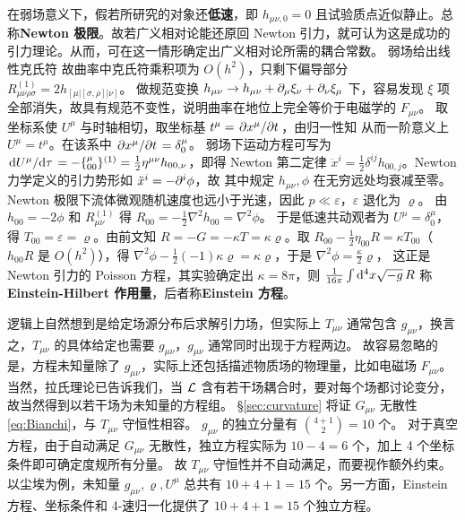 在弱场意义下，假若所研究的对象还\textbf{低速}，即 $h_{\mu\nu,0}=0$ 且试验质点近似静止。总称\textbf{Newton 极限}。故若广义相对论能还原回 Newton 引力，就可认为这是成功的引力理论。从而，可在这一情形确定出广义相对论所需的耦合常数。
弱场给出线性克氏符
故曲率中克氏符乘积项为 $O(h^2)$，只剩下偏导部分 $R^{(1)}_{\mu\nu\rho\sigma} = 2h_{[\mu|[\sigma,\rho]|\nu]}$。
做规范变换 $h_{\mu\nu} \to h_{\mu\nu} + \partial_\mu \xi_\nu + \partial_\nu \xi_\mu$ 下，容易发现 $\xi$ 项全部消失，故具有规范不变性，说明曲率在地位上完全等价于电磁学的 $F_{\mu\nu}$。
取坐标系使 $U^\mu$ 与时轴相切，取坐标基 $t^\mu=\pdv*{x^\mu}{t}$，由归一性知
从而一阶意义上 $U^\mu=t^\mu$。在该系中 $\pdv*{x^\mu}{t} = \delta^\mu_0$。
弱场下运动方程可写为 $\dv*{U^\mu}{\tau}=-\{_{00}^\mu\}^{(1)}= \frac 12 \eta^{\mu\nu} h_{00,\nu}$，即得 Newton 第二定律 $\ddot{x}^i=\frac 12 \delta^{ij} h_{00,j}$。Newton 力学定义的引力势形如 $\ddot{x}^i=-\partial^i\phi$，故
其中规定 $h_{\mu\nu},\phi$ 在无穷远处均衰减至零。
Newton 极限下流体微观随机速度也远小于光速，因此 $p\ll \varepsilon$，$\varepsilon$ 退化为 $\varrho$。
由 $h_{00}=-2\phi$ 和 $R^{(1)}_{\mu\nu}$ 得 $R_{00}=-\frac 12 \nabla^2 h_{00}=\nabla^2\phi$。
于是低速共动观者为 $U^\mu=\delta^\mu_0$，得 $T_{00}=\varepsilon=\varrho$。由前文知 $R=-G=-\kappa T=\kappa\varrho$。取 $R_{00}-\frac{1}{2}\eta_{00} R = \kappa T_{00}$（$h_{00} R$ 是 $O(h^2)$），得 $\nabla^2\phi-\frac 12 (-1)\kappa \varrho=\kappa\varrho$，于是 $\nabla^2\phi = \frac{\kappa}{2}\varrho$，
这正是 Newton 引力的 Poisson 方程，其实验确定出 $\kappa=8\pi$，则
$\frac{1}{16\pi}\int\dd[4]x\sqrt{-g}\, R$ 称\textbf{Einstein-Hilbert 作用量}，后者称\textbf{Einstein 方程}。

逻辑上自然想到是给定场源分布后求解引力场，但实际上 $T_{\mu\nu}$ 通常包含 $g_{\mu\nu}$，换言之，$T_{\mu\nu}$ 的具体给定也需要 $g_{\mu\nu}$，$g_{\mu\nu}$ 通常同时出现于方程两边。
故容易忽略的是，方程未知量除了 $g_{\mu\nu}$，实际上还包括描述物质场的物理量，比如电磁场 $F_{\mu\nu}$。当然，拉氏理论已告诉我们，当 $\mathcal{L}$ 含有若干场耦合时，要对每个场都讨论变分，故当然得到以若干场为未知量的方程组。
\S\ref{sec:curvature} 将证 $G_{\mu\nu}$ 无散性 \eqref{eq:Bianchi}，与 $T_{\mu\nu}$ 守恒性相容。
$g_{\mu\nu}$ 的独立分量有 $\binom{4+1}{2}=10$ 个。
对于真空方程，由于自动满足 $G_{\mu\nu}$ 无散性，独立方程实际为 $10 - 4 = 6$ 个，加上 4 个坐标条件即可确定度规所有分量。
故 $T_{\mu\nu}$ 守恒性并不自动满足，而要视作额外约束。以尘埃为例，未知量 $g_{\mu\nu},\varrho,U^\mu$ 总共有 $10+4+1=15$ 个。另一方面，Einstein 方程、坐标条件和 4-速归一化提供了 $10+4+1=15$ 个独立方程。

